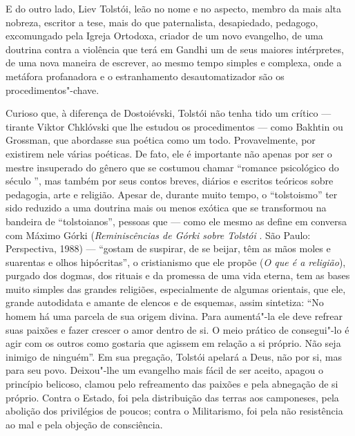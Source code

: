 E do outro lado, Liev Tolstói, leão no nome e no aspecto, membro da mais
alta nobreza, escritor a tese, mais do que paternalista, desapiedado, pedagogo, excomungado pela
Igreja Ortodoxa, criador de um novo evangelho, de uma doutrina contra a
violência que terá em Gandhi um de seus maiores intérpretes, de uma nova
maneira de escrever, ao mesmo tempo simples e complexa, onde a metáfora
profanadora e o estranhamento desautomatizador são os
procedimentos"-chave.

Curioso que, à diferença de Dostoiévski, Tolstói não
tenha tido um crítico --- tirante Viktor Chklóvski que lhe estudou os procedimentos --- como Bakhtin ou Grossman, que abordasse sua
poética como um todo. Provavelmente, por existirem nele várias poéticas. De fato, ele
é importante não apenas por ser o mestre insuperado do gênero que se
costumou chamar ``romance psicológico do século '', mas também por
seus contos breves, diários e escritos teóricos sobre pedagogia, arte e
religião. Apesar de, durante muito tempo, o ``tolstoismo'' ter sido
reduzido a uma doutrina mais ou menos exótica que se transformou na
bandeira de ``tolstoianos'', pessoas que --- como ele mesmo as define em
conversa com Máximo Górki (\emph{Reminiscências de Górki sobre Tolstói
}. São Paulo: Perspectiva, 1988) --- ``gostam de suspirar, de se beijar, têm as
mãos moles e suarentas e olhos hipócritas'', o cristianismo que ele
propõe (\emph{O que é a religião}), purgado dos dogmas, dos rituais e da
promessa de uma vida eterna, tem as bases muito simples das grandes
religiões, especialmente de algumas orientais, que
ele, grande autodidata e amante de elencos e de esquemas, assim
sintetiza: ``No homem há uma parcela de sua origem divina. Para
aumentá"-la ele deve refrear suas paixões e fazer crescer o amor dentro
de si. O meio prático de consegui"-lo é agir com os outros como gostaria
que agissem em relação a si próprio. Não seja inimigo de ninguém''. Em
sua pregação, Tolstói apelará a Deus, não por si, mas para seu povo.
Deixou"-lhe um evangelho mais fácil de ser aceito, apagou o princípio
belicoso, clamou pelo refreamento das paixões e pela abnegação de si
próprio. Contra o Estado, foi pela distribuição das terras aos
camponeses, pela abolição dos privilégios de poucos; contra o
Militarismo, foi pela não resistência ao mal e pela objeção de
consciência.

